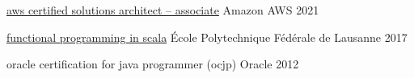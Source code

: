 





\begin{cventries}

    \cventry
    {\href{https://www.credly.com/badges/e5761b98-edf5-44ec-bb32-24f18672e7de/public_url}{aws certified solutions architect – associate}}
    {Amazon AWS} %
    {}
    {2021}
    {}

    \cventry
    {\href{https://www.coursera.org/account/accomplishments/specialization/9NNUCHVNV36F}{functional programming in scala}}
    {École Polytechnique Fédérale de Lausanne} %
    {}
    {2017}
    {}

    \cventry
    {oracle certification for java programmer (ocjp)} %
    {Oracle} %
    {}
    {2012} %
    {}


\end{cventries}
